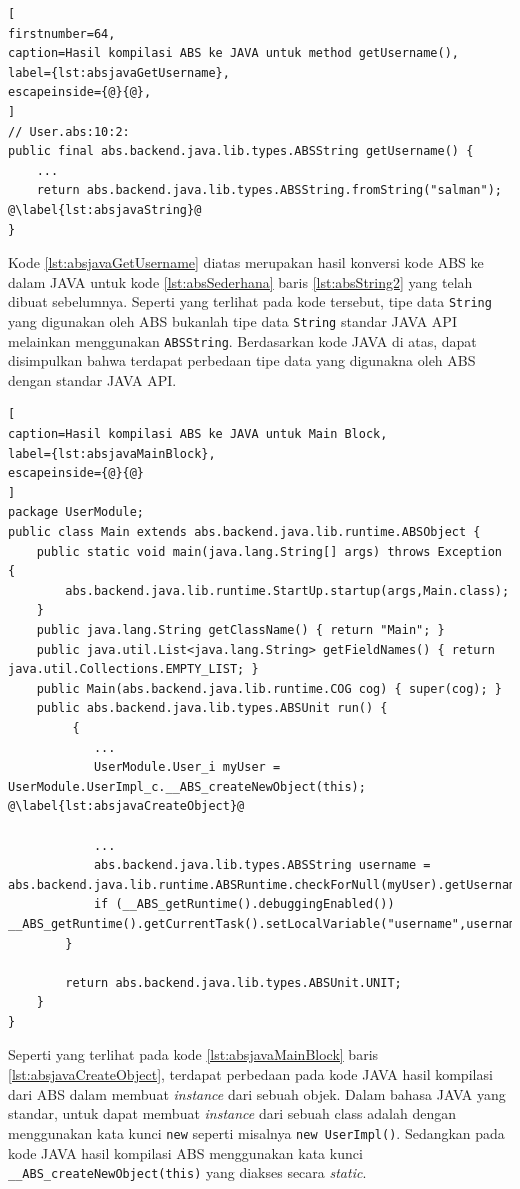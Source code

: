 \begin{lstlisting}[ 
firstnumber=64,
caption=Hasil kompilasi ABS ke JAVA untuk method getUsername(),
label={lst:absjavaGetUsername},
escapeinside={@}{@},
]
// User.abs:10:2: 
public final abs.backend.java.lib.types.ABSString getUsername() {
    ...
    return abs.backend.java.lib.types.ABSString.fromString("salman"); @\label{lst:absjavaString}@
}
\end{lstlisting}

Kode \ref{lst:absjavaGetUsername} diatas merupakan hasil konversi kode ABS ke dalam JAVA untuk kode \ref{lst:absSederhana} baris \ref{lst:absString2} yang telah dibuat sebelumnya. Seperti yang terlihat pada kode tersebut, tipe data \texttt{String} yang digunakan oleh ABS bukanlah tipe data \texttt{String} standar JAVA API melainkan menggunakan \texttt{ABSString}. Berdasarkan kode JAVA di atas, dapat disimpulkan bahwa terdapat perbedaan tipe data yang digunakna oleh ABS dengan standar JAVA API.

\begin{lstlisting}[
caption=Hasil kompilasi ABS ke JAVA untuk Main Block,
label={lst:absjavaMainBlock},
escapeinside={@}{@}
]
package UserModule;
public class Main extends abs.backend.java.lib.runtime.ABSObject {
    public static void main(java.lang.String[] args) throws Exception {
        abs.backend.java.lib.runtime.StartUp.startup(args,Main.class);
    }
    public java.lang.String getClassName() { return "Main"; }
    public java.util.List<java.lang.String> getFieldNames() { return java.util.Collections.EMPTY_LIST; }
    public Main(abs.backend.java.lib.runtime.COG cog) { super(cog); }
    public abs.backend.java.lib.types.ABSUnit run() {
         {
            ...
            UserModule.User_i myUser = UserModule.UserImpl_c.__ABS_createNewObject(this); @\label{lst:absjavaCreateObject}@
            
            ...
            abs.backend.java.lib.types.ABSString username = abs.backend.java.lib.runtime.ABSRuntime.checkForNull(myUser).getUsername();
            if (__ABS_getRuntime().debuggingEnabled()) __ABS_getRuntime().getCurrentTask().setLocalVariable("username",username);
        }
        
        return abs.backend.java.lib.types.ABSUnit.UNIT;
    }
}
\end{lstlisting}

Seperti yang terlihat pada kode \ref{lst:absjavaMainBlock} baris \ref{lst:absjavaCreateObject}, terdapat perbedaan pada kode JAVA hasil kompilasi dari ABS dalam membuat \textit{instance} dari sebuah objek. Dalam bahasa JAVA yang standar, untuk dapat membuat \textit{instance} dari sebuah class adalah dengan menggunakan kata kunci \texttt{new} seperti misalnya \texttt{new UserImpl()}. Sedangkan pada kode JAVA hasil kompilasi ABS menggunakan kata kunci \texttt{\_\_ABS\_createNewObject(this)} yang diakses secara \textit{static}.\\

